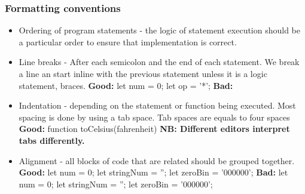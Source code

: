 \documentclass[10pt]{article}
\begin{document}
	    \subsubsection{Formatting conventions}
    	\begin{itemize}
        \item	Ordering of program statements - the logic of statement execution should be a particular order to ensure that implementation is correct. 
        \newline
	        
        \item	Line breaks - After each semicolon and the end of each statement. We break a line an start inline with the previous statement unless it is a logic statement, braces.  
        \newline
	        \textbf{Good:} let num = 0;
	        \newline let op = '*';
	        \newline \textbf{Bad:}
	        \newline 
	        
        \item	Indentation - depending on the statement or function being executed. Most spacing is done by using a tab space. Tab spaces are equals to four spaces
        \newline
	        \textbf{Good:}
	        \newline function toCelsius(fahrenheit) 
	        \newline \textbf{NB: Different editors interpret tabs differently.}
	         
	        
        \item	Alignment - all blocks of code that are related should be  grouped together.
        \newline
	        \textbf{Good:} 
	        \newline let num = 0;
	        \newline let stringNum = '';
	        \newline let zeroBin = '000000';
	        \newline \textbf{Bad:}
	        \newline let num = 0;
	        \newline
	        \newline let stringNum = '';
	        \newline 
	        \newline let zeroBin = '000000';
	        

\end{itemize}
\end{document}
